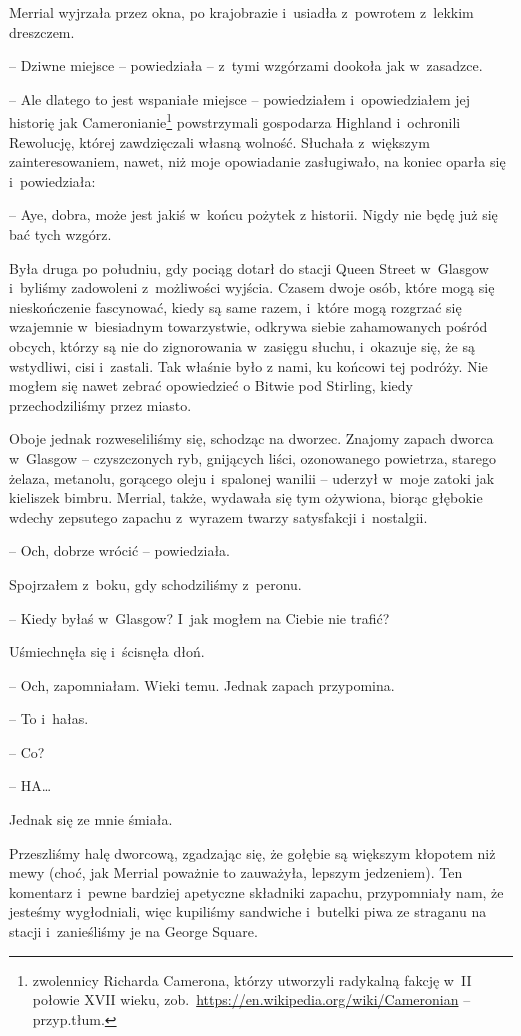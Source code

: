\documentclass[oneside,polish,11pt,sfheadings]{mwbk}
\begin{document}
Merrial wyjrzała przez okna, po krajobrazie i~usiadła z~powrotem z~lekkim dreszczem.

-- Dziwne miejsce -- powiedziała -- z~tymi wzgórzami dookoła jak w~zasadzce.

-- Ale dlatego to jest wspaniałe miejsce -- powiedziałem i~opowiedziałem
jej historię jak Cameronianie\footnote{ zwolennicy Richarda Camerona, którzy
utworzyli radykalną fakcję w~II połowie XVII wieku,
zob.~\url{https://en.wikipedia.org/wiki/Cameronian} -- przyp.tłum.} powstrzymali gospodarza Highland i~ochronili Rewolucję,
której zawdzięczali własną wolność. Słuchała z~większym
zainteresowaniem, nawet, niż moje opowiadanie zasługiwało, na koniec
oparła się i~powiedziała: 

-- Aye, dobra, może jest jakiś w~końcu pożytek
z historii. Nigdy nie będę już się bać tych wzgórz.

Była druga po południu, gdy pociąg dotarł do stacji Queen Street w~Glasgow i~byliśmy zadowoleni z~możliwości wyjścia. Czasem dwoje osób,
które mogą się nieskończenie fascynować, kiedy są same razem, i~które
mogą rozgrzać się wzajemnie w~biesiadnym towarzystwie, odkrywa siebie
zahamowanych pośród obcych, którzy są nie do zignorowania w~zasięgu
słuchu, i~okazuje się, że są wstydliwi, cisi i~zastali. Tak właśnie było
z nami, ku końcowi tej podróży. Nie mogłem się nawet zebrać opowiedzieć
o Bitwie pod Stirling, kiedy przechodziliśmy przez miasto.

Oboje jednak rozweseliliśmy się, schodząc na dworzec. Znajomy zapach
dworca w~Glasgow -- czyszczonych ryb, gnijących liści, ozonowanego
powietrza, starego żelaza, metanolu, gorącego oleju i~spalonej wanilii -- uderzył w~moje zatoki jak kieliszek bimbru. Merrial, także, wydawała się
tym ożywiona, biorąc głębokie wdechy zepsutego zapachu z~wyrazem twarzy
satysfakcji i~nostalgii.

-- Och, dobrze wrócić -- powiedziała.

Spojrzałem z~boku, gdy schodziliśmy z~peronu. 

-- Kiedy byłaś w~Glasgow? I~jak mogłem na Ciebie nie trafić?

Uśmiechnęła się i~ścisnęła dłoń. 

-- Och, zapomniałam. Wieki temu. Jednak
zapach przypomina.

-- To i~hałas.

-- Co?

-- HA\ldots

Jednak się ze mnie śmiała.

Przeszliśmy halę dworcową, zgadzając się, że gołębie są większym
kłopotem niż mewy (choć, jak Merrial poważnie to zauważyła, lepszym
jedzeniem). Ten komentarz i~pewne bardziej apetyczne składniki zapachu,
przypomniały nam, że jesteśmy wygłodniali, więc kupiliśmy sandwiche i~butelki piwa ze straganu na stacji i~zanieśliśmy je na George Square.
\end{document}
